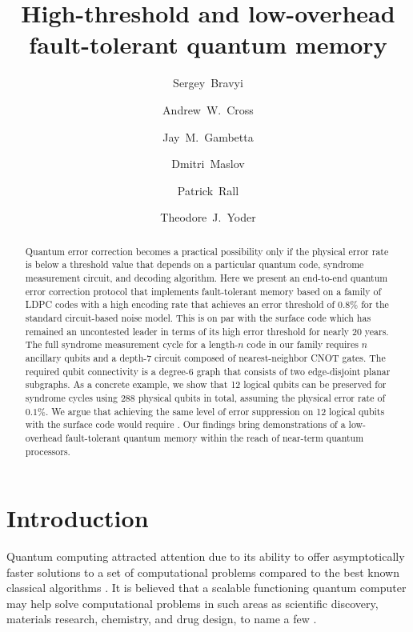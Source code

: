 \documentclass{article}
\title{High-threshold and low-overhead fault-tolerant quantum memory}
\author[1]{Sergey~Bravyi}
\author[1]{Andrew~W.~Cross}
\author[1]{Jay~M.~Gambetta}
\author[1]{Dmitri~Maslov}
\author[2]{Patrick~Rall}
\author[1]{Theodore~J.~Yoder}
\affil[1]{\large{IBM Quantum, IBM T.J. Watson Research Center, Yorktown Heights, NY 10598 (USA)}}
\affil[2]{IBM Quantum, MIT-IBM Watson AI Lab, Cambridge, MA 02142 (USA)}
\newcommand{\edit}[1]{{\color{black}{#1}}}
\begin{document}
\maketitle

\begin{abstract}
Quantum error correction becomes a practical possibility
only if the physical error rate is below a threshold value that depends 
on a particular quantum code, syndrome measurement circuit, and decoding algorithm.
Here we present an end-to-end quantum error correction
protocol that implements fault-tolerant memory based on a family of LDPC codes with a high encoding rate
that achieves an error threshold of $0.8\%$ for the standard
circuit-based noise model. This is on par with the surface code which has remained an uncontested leader
in terms of its high error threshold for nearly 20 years.
The full syndrome measurement cycle for a length-$n$ code
in our family 
requires $n$ ancillary qubits
and a depth-7 circuit composed of nearest-neighbor CNOT gates. 
The required qubit connectivity is a degree-6 graph
that consists of two edge-disjoint planar subgraphs. 
As a concrete example, we
show that 12 logical qubits can be preserved for \edit{nearly one million} syndrome cycles
using 288 physical qubits in total, assuming the physical error rate of $0.1\%$.
We argue that achieving the same level of error suppression on 12 logical qubits with the surface code would require
\edit{nearly  3000 physical qubits}.
Our findings bring demonstrations of
a low-overhead fault-tolerant quantum memory within the reach of near-term quantum processors. 
\end{abstract}



\section{Introduction}

Quantum computing attracted attention due to its ability to offer asymptotically faster solutions to a set of computational problems compared to the best known classical algorithms \cite{nielsen2002quantum}.  It is believed that a scalable functioning quantum computer may help solve computational problems in such areas as scientific discovery, materials research, chemistry, and drug design, to name a few \cite{lloyd1996universal,wang2008quantum,reiher2017elucidating,alexeev2021quantum}.  
\end{document}
